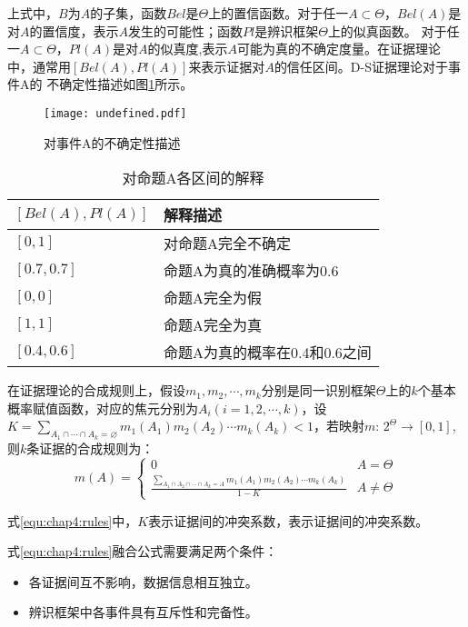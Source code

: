 上式中，$B$为$A$的子集，函数$Bel$是$\Theta$上的置信函数。对于任一$A \subset \Theta$，$Bel(A)$是对$A$的置信度，表示$A$发生的可能性；函数$Pl$是辨识框架$\Theta$上的似真函数。
对于任一$A \subset \Theta$，$Pl(A)$是对$A$的似真度,表示$A$可能为真的不确定度量。在证据理论中，通常用$\left[Bel(A),Pl(A)\right]$来表示证据对$A$的信任区间。D-S证据理论对于事件A的
不确定性描述如图\ref{fig:undefined}所示。
\begin{figure}[H] %
  \centering
  \texttt{[image: undefined.pdf]}
  \caption{对事件A的不确定性描述}
  \label{fig:undefined}
\end{figure}
\begin{table}[htb]
  \centering
  \caption{对命题A各区间的解释}
  \label{tab:undefined}
    \begin{tabular}{C{5.5cm}C{6cm}}
      \toprule
      $\left[Bel(A),Pl(A)\right]$ & 解释描述 \\
      \midrule
      $\left[0,1\right]$ & 对命题A完全不确定 \\
      $\left[0.7,0.7\right]$ & 命题A为真的准确概率为0.6 \\
      $\left[0,0\right]$ & 命题A完全为假 \\
      $\left[1,1\right]$ & 命题A完全为真 \\
      $\left[0.4,0.6\right]$ & 命题A为真的概率在0.4和0.6之间 \\
      \bottomrule
    \end{tabular}
\end{table}

在证据理论的合成规则上，假设$m_1,m_2,\cdots,m_k$分别是同一识别框架$\Theta$上的$k$个基本概率赋值函数，对应的焦元分别为$A_i(i=1,2,\cdots,k)$，设
$K=\sum_{A_{1} \cap \cdots \cap A_{k} = \varnothing } m_{1}\left(A_{1}\right) m_{2}\left(A_{2}\right) \cdots m_{k}\left(A_{k}\right)<1$，若映射$m$:
$2^ \Theta \rightarrow \left[0,1\right]$,则$k$条证据的合成规则为：
\begin{equation}
\label{equ:chap4:rules}
m(A)=\left\{\begin{array}{ll}{0} & {A=\Theta} \\ {\frac{\sum_{A_{1} \cap A_{2} \cap \cdots \cap A_{k}=A} m_{1}\left(A_{1}\right) m_{2}\left(A_{2}\right) \cdots m_{k}\left(A_{k}\right)}{1-K}} & {A \neq \Theta}\end{array}\right.
\end{equation}

式\ref{equ:chap4:rules}中，$K$表示证据间的冲突系数，表示证据间的冲突系数。

式\ref{equ:chap4:rules}融合公式需要满足两个条件\cite{refs81}：
\begin{itemize}
  \item 各证据间互不影响，数据信息相互独立。
  \item 辨识框架中各事件具有互斥性和完备性。 
\end{itemize}

